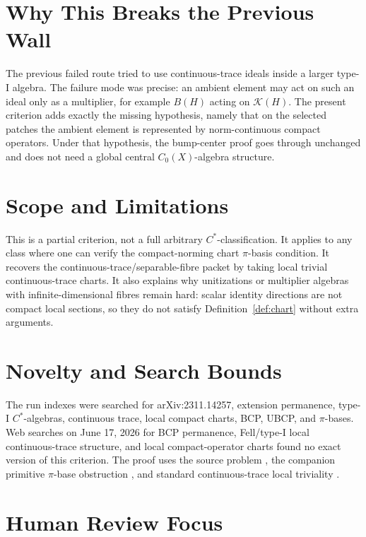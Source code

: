 \documentclass[11pt]{article}
\newcommand{\Kcal}{\mathcal K}
\begin{document}
\section*{Why This Breaks the Previous Wall}

The previous failed route tried to use continuous-trace ideals inside a larger
type-I algebra.  The failure mode was precise: an ambient element may act on
such an ideal only as a multiplier, for example \(B(H)\) acting on \(\Kcal(H)\).
The present criterion adds exactly the missing hypothesis, namely that on the
selected patches the ambient element is represented by norm-continuous compact
operators.  Under that hypothesis, the bump-center proof goes through
unchanged and does not need a global central \(C_0(X)\)-algebra structure.

\section*{Scope and Limitations}

This is a partial criterion, not a full arbitrary \(C^*\)-classification.  It
applies to any class where one can verify the compact-norming chart
\(\pi\)-basis condition.  It recovers the continuous-trace/separable-fibre
packet by taking local trivial continuous-trace charts.  It also explains why
unitizations or multiplier algebras with infinite-dimensional fibres remain
hard: scalar identity directions are not compact local sections, so they do
not satisfy Definition~\ref{def:chart} without extra arguments.

\section*{Novelty and Search Bounds}

The run indexes were searched for arXiv:2311.14257, extension permanence,
type-I \(C^*\)-algebras, continuous trace, local compact charts, BCP, UBCP,
and \(\pi\)-bases.  Web searches on June 17, 2026 for BCP permanence,
Fell/type-I local continuous-trace structure, and local compact-operator
charts found no exact version of this criterion.  The proof uses the source
problem \cite{HKL}, the companion primitive \(\pi\)-base obstruction
\cite{lane19primitive}, and standard continuous-trace local triviality
\cite{Dixmier,RW}.

\section*{Human Review Focus}
\end{document}
